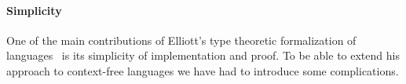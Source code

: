 \paragraph{Simplicity}
One of the main contributions of Elliott's type theoretic formalization of languages~\cite{conal-languages} is its simplicity of implementation and proof. To be able to extend his approach to context-free languages we have had to introduce some complications.
